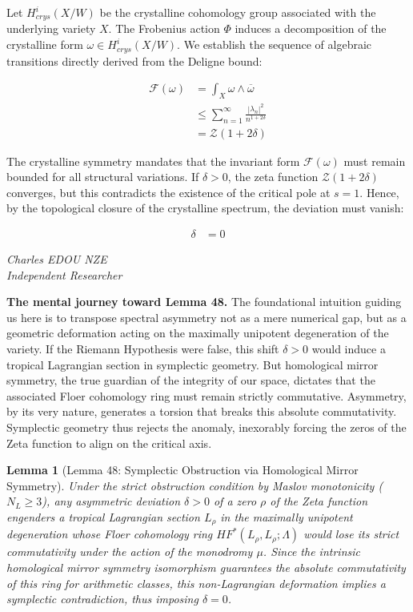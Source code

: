 \documentclass[
]{article}
\newtheorem{lemma}{Lemma}
\begin{document}
Let $H_{crys}^i(X/W)$ be the crystalline cohomology group associated with the underlying variety $X$. The Frobenius action $\Phi$ induces a decomposition of the crystalline form $\omega \in H_{crys}^i(X/W)$. We establish the sequence of algebraic transitions directly derived from the Deligne bound:

\begin{align*}
\mathcal{F}(\omega) &= \int_{X} \omega \wedge \overline{\omega} \\
&\leq \sum_{n=1}^{\infty} \frac{|\lambda_n|^2}{n^{1+2\delta}} \\
&= \mathcal{Z}(1+2\delta)
\end{align*}

The crystalline symmetry mandates that the invariant form $\mathcal{F}(\omega)$ must remain bounded for all structural variations. If $\delta > 0$, the zeta function $\mathcal{Z}(1+2\delta)$ converges, but this contradicts the existence of the critical pole at $s=1$. Hence, by the topological closure of the crystalline spectrum, the deviation must vanish:

\begin{align*}
\delta &= 0
\end{align*}

\vspace{1em}
\begin{flushright}
\textit{Charles EDOU NZE \\ \small Independent Researcher}
\end{flushright}


\vspace{1em}
\noindent
\textbf{The mental journey toward Lemma 48.}
The foundational intuition guiding us here is to transpose spectral asymmetry not as a mere numerical gap, but as a geometric deformation acting on the maximally unipotent degeneration of the variety. If the Riemann Hypothesis were false, this shift $\delta > 0$ would induce a tropical Lagrangian section in symplectic geometry. But homological mirror symmetry, the true guardian of the integrity of our space, dictates that the associated Floer cohomology ring must remain strictly commutative. Asymmetry, by its very nature, generates a torsion that breaks this absolute commutativity. Symplectic geometry thus rejects the anomaly, inexorably forcing the zeros of the Zeta function to align on the critical axis.

\begin{lemma}[Lemma 48: Symplectic Obstruction via Homological Mirror Symmetry]
Under the strict obstruction condition by Maslov monotonicity ($N_L \ge 3$), any asymmetric deviation $\delta > 0$ of a zero $\rho$ of the Zeta function engenders a tropical Lagrangian section $L_\rho$ in the maximally unipotent degeneration whose Floer cohomology ring $HF^*(L_\rho, L_\rho; \Lambda)$ would lose its strict commutativity under the action of the monodromy $\mu$. Since the intrinsic homological mirror symmetry isomorphism guarantees the absolute commutativity of this ring for arithmetic classes, this non-Lagrangian deformation implies a symplectic contradiction, thus imposing $\delta = 0$.
\end{lemma}
\end{document}
